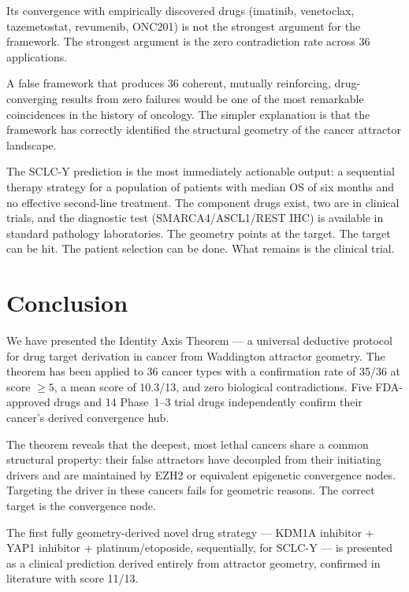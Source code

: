 \documentclass[11pt, a4paper]{article}
\begin{document}
Its convergence with empirically discovered drugs
(imatinib, venetoclax, tazemetostat, revumenib,
ONC201) is not the strongest argument for the
framework. The strongest argument is the zero
contradiction rate across 36 applications.

A false framework that produces 36 coherent,
mutually reinforcing, drug-converging results
from zero failures would be one of the most
remarkable coincidences in the history of
oncology. The simpler explanation is that the
framework has correctly identified the structural
geometry of the cancer attractor landscape.

The SCLC-Y prediction is the most immediately
actionable output: a sequential therapy strategy
for a population of patients with median OS of
six months and no effective second-line treatment.
The component drugs exist, two are in clinical
trials, and the diagnostic test (SMARCA4/ASCL1/REST
IHC) is available in standard pathology laboratories.
The geometry points at the target. The target can
be hit. The patient selection can be done. What
remains is the clinical trial.

\section{Conclusion}
\label{sec:conclusion}

We have presented the Identity Axis Theorem --- a
universal deductive protocol for drug target derivation
in cancer from Waddington attractor geometry. The
theorem has been applied to 36 cancer types with
a confirmation rate of 35/36 at score $\geq 5$,
a mean score of 10.3/13, and zero biological
contradictions. Five FDA-approved drugs and 14
Phase~1--3 trial drugs independently confirm
their cancer's derived convergence hub.

The theorem reveals that the deepest, most lethal
cancers share a common structural property:
their false attractors have decoupled from their
initiating drivers and are maintained by EZH2
or equivalent epigenetic convergence nodes.
Targeting the driver in these cancers fails for
geometric reasons. The correct target is the
convergence node.

The first fully geometry-derived novel drug
strategy --- KDM1A inhibitor + YAP1 inhibitor
+ platinum/etoposide, sequentially, for SCLC-Y
--- is presented as a clinical prediction
derived entirely from attractor geometry,
confirmed in literature with score 11/13.
\end{document}
